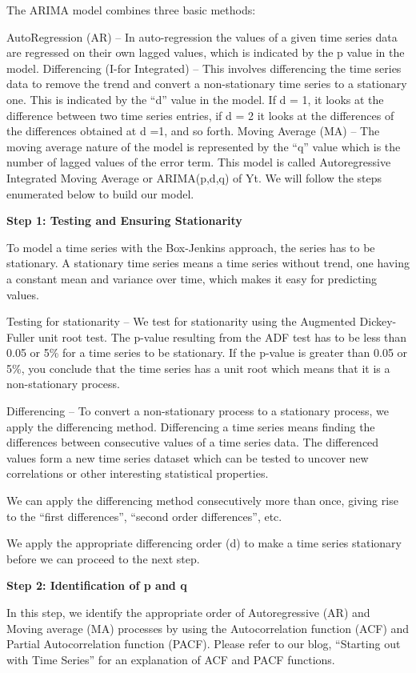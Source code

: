 \documentclass[a4paper, 12pt]{extarticle}
\begin{document}
{The ARIMA model combines three basic methods:

AutoRegression (AR) – In auto-regression the values of a given time series data are regressed on their own lagged values, which is indicated by the p value in the model.
Differencing (I-for Integrated) – This involves differencing the time series data to remove the trend and convert a non-stationary time series to a stationary one. This is indicated by the “d” value in the model. If d = 1, it looks at the difference between two time series entries, if d = 2 it looks at the differences of the differences obtained at d =1, and so forth.
Moving Average (MA) – The moving average nature of the model is represented by the “q” value which is the number of lagged values of the error term.
This model is called Autoregressive Integrated Moving Average or ARIMA(p,d,q) of Yt.  We will follow the steps enumerated below to build our model.

\textbf{Step 1: Testing and Ensuring Stationarity}

To model a time series with the Box-Jenkins approach, the series has to be stationary. A stationary time series means a time series without trend, one having a constant mean and variance over time, which makes it easy for predicting values.

Testing for stationarity – We test for stationarity using the Augmented Dickey-Fuller unit root test. The p-value resulting from the ADF test has to be less than 0.05 or 5\% for a time series to be stationary. If the p-value is greater than 0.05 or 5\%, you conclude that the time series has a unit root which means that it is a non-stationary process.

Differencing – To convert a non-stationary process to a stationary process, we apply the differencing method. Differencing a time series means finding the differences between consecutive values of a time series data. The differenced values form a new time series dataset which can be tested to uncover new correlations or other interesting statistical properties.

We can apply the differencing method consecutively more than once, giving rise to the “first differences”, “second order differences”, etc.

We apply the appropriate differencing order (d) to make a time series stationary before we can proceed to the next step.

\textbf{Step 2: Identification of p and q}

In this step, we identify the appropriate order of Autoregressive (AR) and Moving average (MA) processes by using the Autocorrelation function (ACF) and Partial Autocorrelation function (PACF).  Please refer to our blog, “Starting out with Time Series” for an explanation of ACF and PACF functions.

}
\end{document}

